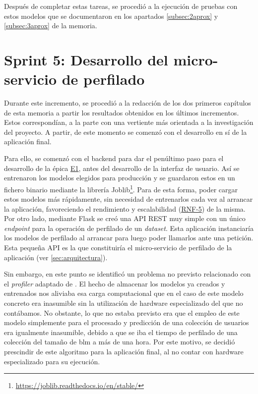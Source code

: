 Después de completar estas tareas, se procedió a la ejecución de pruebas con estos modelos que se documentaron en los apartados \ref{subsec:2aprox} y \ref{subsec:3aprox} de la memoria. 

\section{Sprint 5: Desarrollo del micro-servicio de perfilado}
Durante este incremento, se procedió a la redacción de los dos primeros capítulos de esta memoria a partir los resultados obtenidos en los últimos incrementos. Estos correspondían, a la parte con una vertiente más orientada a la investigación del proyecto. A partir, de este momento se comenzó con el desarrollo en sí de la aplicación final.

Para ello, se comenzó con el backend para dar el penúltimo paso para el desarrollo de la épica \hyperref[tab:user-stories]{E1}, antes del desarrollo de la interfaz de usuario. Así se entrenaron los modelos elegidos para producción y se guardaron estos en un fichero binario mediante la librería Joblib\footnote{\url{https://joblib.readthedocs.io/en/stable/}}. Para de esta forma, poder cargar estos modelos más rápidamente, sin necesidad de entrenarlos cada vez al arrancar la aplicación, favoreciendo el rendimiento y escalabilidad (\hyperref[tab:user-stories]{RNF-5}) de la misma. Por otro lado, mediante Flask se creó una API REST muy simple con un único \textit{endpoint} para la operación de perfilado de un \textit{dataset}. Esta aplicación instanciaría los modelos de perfilado al arrancar para luego poder llamarlos ante una petición. Esta pequeña API es la que constituiría el micro-servicio de perfilado de la aplicación (ver \ref{sec:arquitectura}).

Sin embargo, en este punto se identificó un problema no previsto relacionado con el \textit{profiler} adaptado de \citet{loscalis22}. El hecho de almacenar los modelos ya creados y entrenados nos aliviaba esa carga computacional que en el caso de este modelo concreto era inasumible sin la utilización de hardware especializado del que no contábamos. No obstante, lo que no estaba previsto era que el empleo de este modelo simplemente para el procesado y predicción de una colección de usuarios era igualmente inasumible, debido a que se iba el tiempo de perfilado de una colección del tamaño de \acrshort{blm} a más de una hora. Por este motivo, se decidió prescindir de este algoritmo para la aplicación final, al no contar con hardware especializado para su ejecución.

